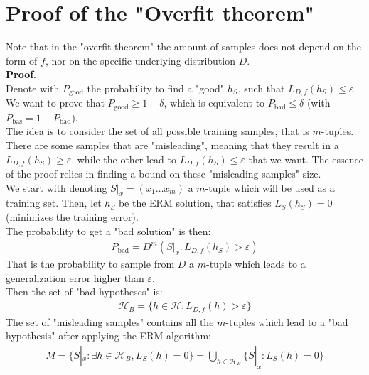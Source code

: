 \documentclass[../template.tex]{subfiles}
\begin{document}
\section{Proof of the "Overfit theorem"}

Note that in the "overfit theorem" the amount of samples does not depend on the form of $f$, nor on the specific underlying distribution $D$.\\

\textbf{Proof}.\\
Denote with $P_{\mathrm{good} }$ the probability to find a "good" $h_S$, such that $L_{D,f}(h_S) \leq \varepsilon$. We want to prove that $P_{\mathrm{good}} \geq 1-\delta$, which is equivalent to $P_{\mathrm{bad}} \leq \delta$ (with $P_{\mathrm{bas}} = 1-P_\mathrm{bad}$).\\
The idea is to consider the set of all possible training samples, that is $m$-tuples. There are some samples that are "misleading", meaning that they result in a $L_{D,f}(h_S) \geq \varepsilon$, while the other lead to $L_{D,f}(h_S) \leq \varepsilon$ that we want. The essence of the proof relies in finding a bound on these "misleading samples" size.\\

We start with denoting $S|_x = (x_1 \dots x_m)$ a $m$-tuple which will be used as a training set. Then, let $h_S$ be the ERM solution, that satisfies $L_S(h_S) = 0$ (minimizes the training error).\\
The probability to get a "bad solution" is then:
\begin{align*}
    P_{\mathrm{bad} } = D^m (S|_x \colon L_{D,f}(h_S) > \varepsilon)
\end{align*} 
That is the probability to sample from $D$ a $m$-tuple which leads to a generalization error higher than $\varepsilon$.\\   
Then the set of "bad hypotheses" is:
\begin{align*}
    \mathcal{H}_B = \{ h \in \mathcal{H} \colon L_{D,f} (h) > \varepsilon\}
\end{align*}
The set of "misleading samples" contains all the $m$-tuples which lead to a "bad hypothesis" after applying the ERM algorithm:
\begin{align*}
    M = \{ S|_x \colon \exists h \in \mathcal{H}_B, L_S(h) = 0\} = \bigcup_{h\in \mathcal{H}_B} \{S|_x \colon L_S(h) = 0\}
\end{align*}
\end{document}
